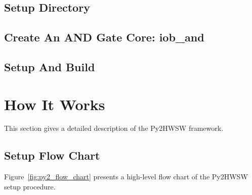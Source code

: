 \documentclass{ug}
\begin{document}
\subsection{Setup Directory}
\label{sec:setup_dir}


\subsection{Create An AND Gate Core: iob\_and}
\label{sec:iob_and}


\subsection{Setup And Build}
\label{sec:setup_build}


%

%

%
%
\ifdefined\SECTIONCLEARPAGE
\clearpage
\fi
\section{How It Works}
\label{sec:how_it_works}

This section gives a detailed description of the Py2HWSW framework.

% 
% 
% 

\subsection{Setup Flow Chart}
\label{sec:py2_flow_chart}

Figure~\ref{fig:py2_flow_chart} presents a high-level flow chart of the Py2HWSW setup procedure.
\end{document}
